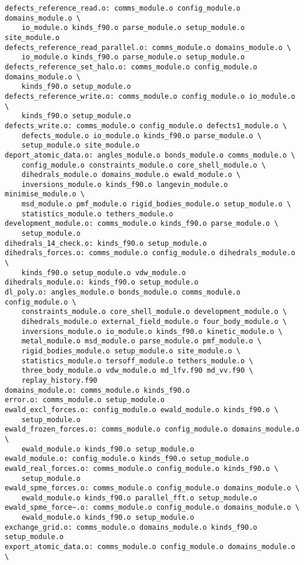 \begin{verbatim}
defects_reference_read.o: comms_module.o config_module.o domains_module.o \
	io_module.o kinds_f90.o parse_module.o setup_module.o site_module.o
defects_reference_read_parallel.o: comms_module.o domains_module.o \
	io_module.o kinds_f90.o parse_module.o setup_module.o
defects_reference_set_halo.o: comms_module.o config_module.o domains_module.o \
	kinds_f90.o setup_module.o
defects_reference_write.o: comms_module.o config_module.o io_module.o \
	kinds_f90.o setup_module.o
defects_write.o: comms_module.o config_module.o defects1_module.o \
	defects_module.o io_module.o kinds_f90.o parse_module.o \
	setup_module.o site_module.o
deport_atomic_data.o: angles_module.o bonds_module.o comms_module.o \
	config_module.o constraints_module.o core_shell_module.o \
	dihedrals_module.o domains_module.o ewald_module.o \
	inversions_module.o kinds_f90.o langevin_module.o minimise_module.o \
	msd_module.o pmf_module.o rigid_bodies_module.o setup_module.o \
	statistics_module.o tethers_module.o
development_module.o: comms_module.o kinds_f90.o parse_module.o \
	setup_module.o
dihedrals_14_check.o: kinds_f90.o setup_module.o
dihedrals_forces.o: comms_module.o config_module.o dihedrals_module.o \
	kinds_f90.o setup_module.o vdw_module.o
dihedrals_module.o: kinds_f90.o setup_module.o
dl_poly.o: angles_module.o bonds_module.o comms_module.o config_module.o \
	constraints_module.o core_shell_module.o development_module.o \
	dihedrals_module.o external_field_module.o four_body_module.o \
	inversions_module.o io_module.o kinds_f90.o kinetic_module.o \
	metal_module.o msd_module.o parse_module.o pmf_module.o \
	rigid_bodies_module.o setup_module.o site_module.o \
	statistics_module.o tersoff_module.o tethers_module.o \
	three_body_module.o vdw_module.o md_lfv.f90 md_vv.f90 \
	replay_history.f90
domains_module.o: comms_module.o kinds_f90.o
error.o: comms_module.o setup_module.o
ewald_excl_forces.o: config_module.o ewald_module.o kinds_f90.o \
	setup_module.o
ewald_frozen_forces.o: comms_module.o config_module.o domains_module.o \
	ewald_module.o kinds_f90.o setup_module.o
ewald_module.o: config_module.o kinds_f90.o setup_module.o
ewald_real_forces.o: comms_module.o config_module.o kinds_f90.o \
	setup_module.o
ewald_spme_forces.o: comms_module.o config_module.o domains_module.o \
	ewald_module.o kinds_f90.o parallel_fft.o setup_module.o
ewald_spme_force~.o: comms_module.o config_module.o domains_module.o \
	ewald_module.o kinds_f90.o setup_module.o
exchange_grid.o: comms_module.o domains_module.o kinds_f90.o setup_module.o
export_atomic_data.o: comms_module.o config_module.o domains_module.o \

\end{verbatim}
